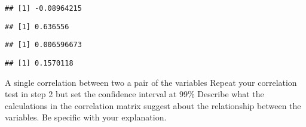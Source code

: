 \documentclass[
]{article}
\newenvironment{Shaded}{\begin{snugshade}}{\end{snugshade}}
\newcommand{\AttributeTok}[1]{\textcolor[rgb]{0.77,0.63,0.00}{#1}}
\newcommand{\FloatTok}[1]{\textcolor[rgb]{0.00,0.00,0.81}{#1}}
\newcommand{\FunctionTok}[1]{\textcolor[rgb]{0.00,0.00,0.00}{#1}}
\newcommand{\NormalTok}[1]{#1}
\newcommand{\SpecialCharTok}[1]{\textcolor[rgb]{0.00,0.00,0.00}{#1}}
\newcommand{\StringTok}[1]{\textcolor[rgb]{0.31,0.60,0.02}{#1}}
\begin{document}
\begin{verbatim}
## [1] -0.08964215
\end{verbatim}

\begin{Shaded}
\end{Shaded}

\begin{verbatim}
## [1] 0.636556
\end{verbatim}

\begin{Shaded}
\end{Shaded}

\begin{verbatim}
## [1] 0.006596673
\end{verbatim}

\begin{Shaded}
\end{Shaded}

\begin{verbatim}
## [1] 0.1570118
\end{verbatim}

A single correlation between two a pair of the variables Repeat your
correlation test in step 2 but set the confidence interval at 99\%
Describe what the calculations in the correlation matrix suggest about
the relationship between the variables. Be specific with your
explanation.

\begin{Shaded}
\end{Shaded}
\end{document}
